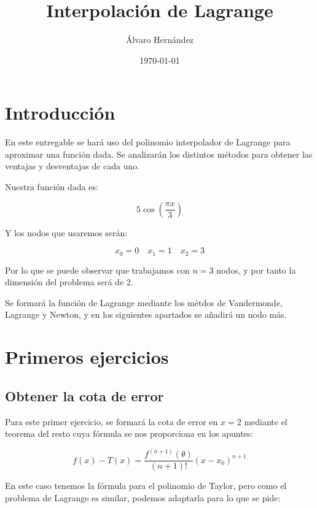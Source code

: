 \documentclass{article}
\title{Interpolación de Lagrange}
\author{Álvaro Hernández}
\date{\today}
\begin{document}

\maketitle
\tableofcontents
\newpage

\section{Introducción}

En este entregable se hará uso del polinomio interpolador de Lagrange para aproximar una función dada. Se analizarán los distintos métodos para obtener las ventajas y desventajas de cada uno.

Nuestra función dada es:

\begin{equation}\label{funcion}
	5 \cos \left( \frac{\pi x}{3} \right)
\end{equation}

Y los nodos que usaremos serán:

\begin {equation}\label{nodos}
x_{0} = 0 \quad x_{1} = 1 \quad x_{2} = 3
\end{equation}

Por lo que se puede observar que trabajamos con $n = 3$ nodos, y por tanto la dimensión del problema será de 2.

Se formará la función de Lagrange mediante los métdos de Vandermonde, Lagrange y Newton, y en los siguientes apartados se añadirá un nodo más.

\section{Primeros ejercicios}

\subsection{Obtener la cota de error}

Para este primer ejercicio, se formará la cota de error en $x=2$ mediante el teorema del resto cuya fórmula se nos proporciona en los apuntes:

\begin{equation}
	f(x) - T(x) = \frac{f^{(n+1)}(\theta)}{(n+1)!}(x-x_0)^{n+1}
\end{equation}

En este caso tenemos la fórmula para el polinomio de Taylor, pero como el problema de Lagrange es similar, podemos adaptarla para lo que se pide:
\end{document}
